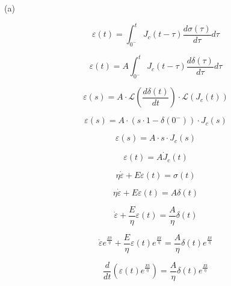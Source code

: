 \documentclass{article}
\begin{document}
(a)

\begin{equation*}
    \varepsilon(t) = \int_{0^-}^{t} J_c(t-\tau) \frac{d\sigma(\tau)}{d\tau} d\tau
\end{equation*}

\begin{equation*}
    \varepsilon(t) = A \int_{0^-}^{t} J_c(t-\tau) \frac{d\delta(\tau)}{d\tau} d\tau
\end{equation*}

\begin{equation*}
    \varepsilon(s) = A \cdot \mathcal{L}(\frac{d\delta(t)}{dt}) \cdot \mathcal{L}(J_c(t)) 
\end{equation*}

\begin{equation*}
    \varepsilon(s) = A \cdot (s \cdot 1 - \delta(0^-)) \cdot J_c(s)
\end{equation*}

\begin{equation*}
    \varepsilon(s) = A \cdot s \cdot J_c(s)
\end{equation*}

\begin{equation*}
    \varepsilon(t) = A \dot J_c(t)
\end{equation*}

\bigskip

\begin{equation*}
    \eta \dot\varepsilon + E \varepsilon(t) = \sigma(t)
\end{equation*}

\begin{equation*}
    \eta \dot\varepsilon + E \varepsilon(t) = A \delta(t)
\end{equation*}

\begin{equation*}
    \dot\varepsilon + \frac{E}{\eta} \varepsilon(t) = \frac{A}{\eta} \delta(t)
\end{equation*}

\begin{equation*}
    \dot\varepsilon e^\frac{Et}{\eta} + \frac{E}{\eta} \varepsilon(t) e^\frac{Et}{\eta} = \frac{A}{\eta} \delta(t) e^\frac{Et}{\eta}
\end{equation*}

\begin{equation*}
    \frac{d}{dt} (\varepsilon(t) e^\frac{Et}{\eta}) = \frac{A}{\eta} \delta(t) e^\frac{Et}{\eta}
\end{equation*}
\end{document}
